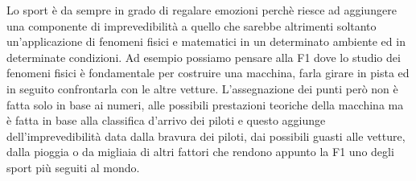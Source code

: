 
Lo sport è da sempre in grado di regalare emozioni perchè riesce ad aggiungere una componente di imprevedibilità a quello che sarebbe altrimenti soltanto un'applicazione di fenomeni fisici e matematici in un determinato ambiente ed in determinate condizioni. Ad esempio possiamo pensare alla F1 dove lo studio dei fenomeni fisici è fondamentale per costruire una macchina, farla girare in pista ed in seguito confrontarla con le altre vetture. L'assegnazione dei punti però non è fatta solo in base ai numeri, alle possibili prestazioni teoriche della macchina ma è fatta in base alla classifica d'arrivo dei piloti e questo aggiunge dell'imprevedibilità data dalla bravura dei piloti, dai possibili guasti alle vetture, dalla pioggia o da migliaia di altri fattori che rendono appunto la F1 uno degli sport più seguiti al mondo.
